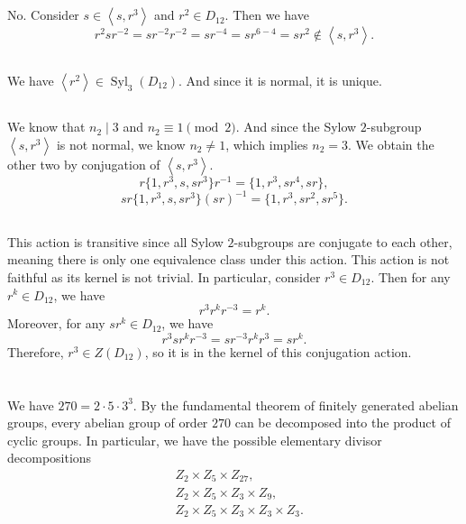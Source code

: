 \documentclass[12pt]{article}
\newcommand{\<}{\left\langle}
\renewcommand{\>}{\right\rangle}
\newcommand{\Syl}{\operatorname{Syl}}
\begin{document}
\subsection{}

No. Consider $s \in \<s, r^3\>$ and $r^2 \in D_{12}$. Then we have
\[
    r^2sr^{-2} = sr^{-2}r^{-2} = sr^{-4} = sr^{6-4} = sr^2 \notin \<s, r^3\>.
\]

\subsection{}

We have $\<r^2\> \in \Syl_3(D_{12})$. And since it is normal, it is unique.

\subsection{}

We know that $n_2 \mid 3$ and $n_2 \equiv 1 \pmod{2}$. And since the Sylow $2$-subgroup $\<s, r^3\>$ is not normal, we know $n_2 \ne 1$, which implies $n_2 = 3$. We obtain the other two by conjugation of $\<s, r^3\>$.
\[
    r\{1, r^3, s, sr^3\}r^{-1} = \{1, r^3, sr^4, sr\},
\]
\[
    sr\{1, r^3, s, sr^3\}(sr)^{-1} = \{1, r^3, sr^2, sr^5\}.
\]

\subsection{}
This action is transitive since all Sylow $2$-subgroups are conjugate to each other, meaning there is only one equivalence class under this action. This action is not faithful as its kernel is not trivial. In particular, consider $r^3 \in D_{12}$. Then for any $r^k \in D_{12}$, we have
\[
    r^3r^kr^{-3} = r^k.
\]
Moreover, for any $sr^k \in D_{12}$, we have
\[
    r^3 sr^k r^{-3} = s r^{-3} r^k r^3 = sr^k.
\]
Therefore, $r^3 \in Z(D_{12})$, so it is in the kernel of this conjugation action.

\newpage

\section{}
We have $270 = 2 \cdot 5 \cdot 3^3$. By the fundamental theorem of finitely generated abelian groups, every abelian group of order $270$ can be decomposed into the product of cyclic groups. In particular, we have the possible elementary divisor decompositions
\begin{align*}
    &Z_2 \times Z_5 \times Z_{27}, \\
    &Z_2 \times Z_5 \times Z_3 \times Z_9, \\
    &Z_2 \times Z_5 \times Z_3 \times Z_3 \times Z_3.
\end{align*}
\end{document}
